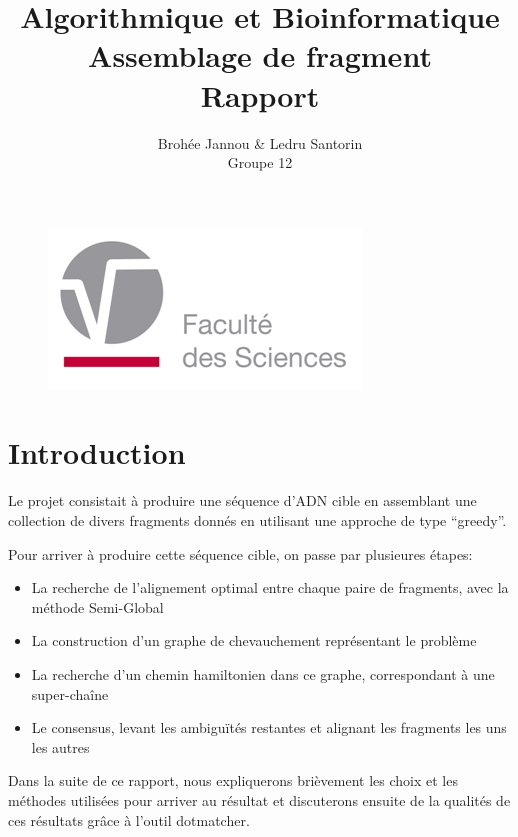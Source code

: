 \documentclass[a4paper]{article}
\begin{document}
\title{Algorithmique et Bioinformatique \\ Assemblage de fragment \\ Rapport}
\author{Broh\'ee Jannou \& Ledru Santorin  \\ Groupe 12}
\maketitle
\begin{figure}[!htb]
\begin{center}
  \includegraphics[width=\textwidth]{illustrations/UMONS_FS.jpg}
\end{center}
\end{figure}
\newpage
{}
\renewcommand{\contentsname}{Table des matières}
\tableofcontents

\newpage
{}
\section{Introduction}

Le projet consistait à produire une séquence d'ADN cible en assemblant
une collection de divers fragments donnés en utilisant une approche
de type ``greedy''.

Pour arriver à produire cette séquence cible, on passe par plusieures
étapes:
\begin{itemize}
\item La recherche de l'alignement optimal entre chaque paire de fragments,
avec la méthode Semi-Global
\item La construction d'un graphe de chevauchement représentant le problème
\item La recherche d'un chemin hamiltonien dans ce graphe, correspondant
à une super-chaîne
\item Le consensus, levant les ambiguïtés restantes et alignant les fragments
les uns les autres
\end{itemize}
Dans la suite de ce rapport, nous expliquerons brièvement les choix
et les méthodes utilisées pour arriver au résultat et discuterons
ensuite de la qualités de ces résultats grâce à l'outil dotmatcher.
\end{document}
